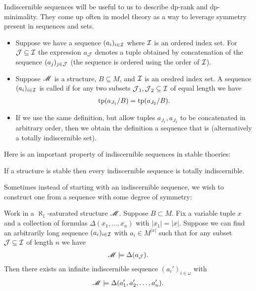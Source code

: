 Indiscernible sequences will be useful to us to describe dp-rank and dp-minimality.
They come up often in model theory as a way to leverage symmetry present in sequences and sets.
\begin{Definition}
  \begin{itemize}
  \item Suppose we have a sequence $(a_i)_{i \in \operatorname{\mathcal I}}$ where $\operatorname{\mathcal I}$ is an ordered index set.
    For $\operatorname{\mathcal J} \subseteq \operatorname{\mathcal I}$ the expression $a_{\operatorname{\mathcal J}}$ denotes  a tuple obtained by concatenation of the sequence $(a_j)_{j \in \operatorname{\mathcal J}}$
    (the sequence is ordered using the order of $\operatorname{\mathcal I}$).    
  \item Suppose $\mathscr M$ is a structure, $B \subseteq M$, and $\operatorname{\mathcal I}$ is an oredred index set. 
    A sequence $(a_i)_{i \in \operatorname{\mathcal I}}$ is called  if
    for any two subsets $\operatorname{\mathcal J}_1, \operatorname{\mathcal J}_2 \subseteq \operatorname{\mathcal I}$ of equal length we have 
    \begin{align*}
      \operatorname{tp}(a_{J_1}/B) = \operatorname{tp}(a_{J_2}/B).
    \end{align*}
  \item If we use the same definition, but allow tuples $a_{J_1}, a_{J_2}$ to be concatenated in arbitrary order,
    then we obtain the definition a sequence that is  (alternatively a totally indiscernible set).
  \end{itemize}
\end{Definition}

Here is an important property of indiscernible sequences in stable thoeries:
\begin{Lemma} \label{totally}
  If a structure is stable then every indiscernible sequence is totally indiscernible.
\end{Lemma}

Sometimes instead of starting with an indiscernible sequence, we wish to construct one from a sequence with some degree of symmetry:
\begin{Lemma} 
  Work in a $\aleph_1$-saturated structure $\mathscr M$.
  Suppose $B \subset M$.
  Fix a variable tuple $x$ and a collection of formulas $\Delta(x_1, \ldots, x_n)$ with $|x_1| = |x|$.
  Suppose we can find an arbitrarily long sequence $(a_i)_{i \in \operatorname{\mathcal I}}$ with $a_i \in M^{|x|}$ such that
  for any subset $\operatorname{\mathcal J} \subseteq \operatorname{\mathcal I}$ of length $n$ we have
  \begin{align*}
    \mathscr M \models \Delta(a_{\operatorname{\mathcal J}}).
  \end{align*}
  Then there exists an infinite indiscernible sequence $(a_i')_{i \in \omega}$ with
  \begin{align*}
    \mathscr M \models \Delta(a_1', a_2', \ldots, a_n').
  \end{align*}
\end{Lemma}

